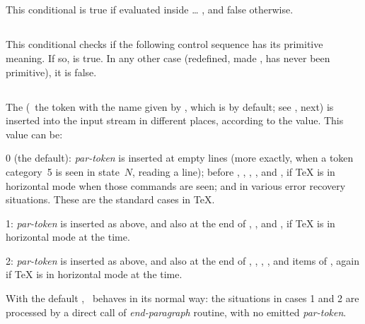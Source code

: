 \documentclass{pdftexmanual}
\begin{document}
\subsection{}

This conditional is true if evaluated inside  \ldots
{}, and false otherwise.

\subsection{}

This conditional checks if the following control sequence has its
primitive meaning. If so,  is true. In any other case
(redefined, made , has never been primitive), it is false.

\subsection{}

The  (\ie\ the token with the name given by
, which is  by default; see ,
next) is inserted into the input stream in different places, according
to the  value. This value can be:

0 (the default): {\em par-token} is inserted at empty lines (more
   exactly, when a token category~5 is seen in state~$N$, reading a
   line); before , , , , and
   , if \TeX{} is in horizontal mode when those commands are
   seen; and in various error recovery situations. These are the
   standard cases in \TeX.

1: {\em par-token} is inserted as above, and also at the end of
   , , and , if \TeX{} is in
   horizontal mode at the time.

2: {\em par-token} is inserted as above, and also at the end of
  , , , , and
  items of , again if \TeX{} is in horizontal mode at the
  time.

With the default , \TEX\ behaves in its normal
way: the situations in cases 1 and 2 are processed by a direct call of
{\em end-paragraph} routine, with no emitted {\em par-token}.
\end{document}
